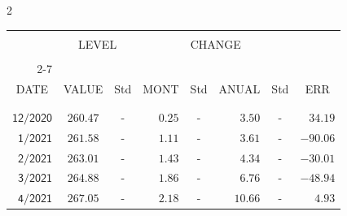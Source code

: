 \begin{multicols}{2}{ 
\begin{tabular}{rccrcrcr} 
\hline 
 \multicolumn{1}{|c|}{}  &  \multicolumn{2}{c|}{} & 
\multicolumn{4}{c}{} & \multicolumn{1}{|c|}{}\vspace{-.10in}\\ 
\multicolumn{1}{|c|}{}  &  \multicolumn{2}{c|}{LEVEL} & 
\multicolumn{4}{c}{CHANGE} & \multicolumn{1}{|c|}{}    \\  
\multicolumn{1}{|c|}{}  &  \multicolumn{2}{c|}{} & 
\multicolumn{4}{c}{} & \multicolumn{1}{|c|}{}\vspace{-.10in}\\ \cline{2-7} 
\multicolumn{1}{|c|}{ } &\multicolumn{1}{c|}{ } & \multicolumn{1}{c|}{} & \multicolumn{1}{c|}{} & \multicolumn{1}{c|}{}     & \multicolumn{1}{c|}{} & \multicolumn{1}{c|}{}  & \multicolumn{1}{c|}{}  \vspace{-.05in}\\  
\multicolumn{1}{|c|}{DATE } &\multicolumn{1}{c|}{ VALUE} & \multicolumn{1}{c|}{Std} & \multicolumn{1}{c|}{MONT} & \multicolumn{1}{c|}{Std}     & \multicolumn{1}{c|}{ANUAL} & \multicolumn{1}{c|}{Std}  & \multicolumn{1}{c|}{ERR}\\  
\multicolumn{1}{|c|}{ }      & \multicolumn{1}{c|}{  }    & \multicolumn{1}{c|}{ }&  \multicolumn{1}{c|}{   }  & \multicolumn{1}{c|}{ } & \multicolumn{1}{c|}{  }     & \multicolumn{1}{c|}{   }  &  \multicolumn{1}{c|}{   } \\  
 \hline 
 \\$\mathsf{      12/2020}$ &$\mathsf{   260.47}$ &     - &$\mathsf{    0.25}$ &     - &$\mathsf{     3.50 }$ &     - &$\mathsf{  34.19} $ \vspace{-.005in}\\ 
$\mathsf{       1/2021}$ &$\mathsf{   261.58}$ &     - &$\mathsf{    1.11}$ &     - &$\mathsf{     3.61 }$ &     - &$\mathsf{ -90.06} $ \vspace{-.005in}\\ 
$\mathsf{       2/2021}$ &$\mathsf{   263.01}$ &     - &$\mathsf{    1.43}$ &     - &$\mathsf{     4.34 }$ &     - &$\mathsf{ -30.01} $ \vspace{-.005in}\\ 
$\mathsf{       3/2021}$ &$\mathsf{   264.88}$ &     - &$\mathsf{    1.86}$ &     - &$\mathsf{     6.76 }$ &     - &$\mathsf{ -48.94} $ \vspace{-.005in}\\ 
$\mathsf{       4/2021}$ &$\mathsf{   267.05}$ &     - &$\mathsf{    2.18}$ &     - &$\mathsf{    10.66 }$ &     - &$\mathsf{   4.93} $ \vspace{-.005in}\\ 

\end{tabular}}
\end{multicols}
